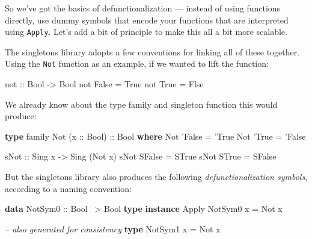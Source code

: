 \documentclass[]{article}
\newenvironment{Shaded}{}{}
\newcommand{\CommentTok}[1]{\textcolor[rgb]{0.38,0.63,0.69}{\textit{#1}}}
\newcommand{\DataTypeTok}[1]{\textcolor[rgb]{0.56,0.13,0.00}{#1}}
\newcommand{\FunctionTok}[1]{\textcolor[rgb]{0.02,0.16,0.49}{#1}}
\newcommand{\KeywordTok}[1]{\textcolor[rgb]{0.00,0.44,0.13}{\textbf{#1}}}
\newcommand{\NormalTok}[1]{#1}
\newcommand{\OtherTok}[1]{\textcolor[rgb]{0.00,0.44,0.13}{#1}}
\begin{document}
So we've got the basics of defunctionalization --- instead of using functions
directly, use dummy symbols that encode your functions that are interpreted
using \texttt{Apply}. Let's add a bit of principle to make this all a bit more
scalable.

The singletons library adopts a few conventions for linking all of these
together. Using the \texttt{Not} function as an example, if we wanted to lift
the function:

\begin{Shaded}
\begin{Highlighting}[]
\NormalTok{not}\OtherTok{ ::} \DataTypeTok{Bool} \OtherTok{->} \DataTypeTok{Bool}
\NormalTok{not }\DataTypeTok{False} \FunctionTok{=} \DataTypeTok{True}
\NormalTok{not }\DataTypeTok{True}  \FunctionTok{=} \DataTypeTok{Flse}
\end{Highlighting}
\end{Shaded}

We already know about the type family and singleton function this would produce:

\begin{Shaded}
\begin{Highlighting}[]
\KeywordTok{type}\NormalTok{ family }\DataTypeTok{Not}\NormalTok{ (}\OtherTok{x ::} \DataTypeTok{Bool}\NormalTok{)}\OtherTok{ ::} \DataTypeTok{Bool} \KeywordTok{where}
    \DataTypeTok{Not}\NormalTok{ '}\DataTypeTok{False} \FunctionTok{=}\NormalTok{ '}\DataTypeTok{True}
    \DataTypeTok{Not}\NormalTok{ '}\DataTypeTok{True}  \FunctionTok{=}\NormalTok{ '}\DataTypeTok{False}

\OtherTok{sNot ::} \DataTypeTok{Sing}\NormalTok{ x }\OtherTok{->} \DataTypeTok{Sing}\NormalTok{ (}\DataTypeTok{Not}\NormalTok{ x)}
\NormalTok{sNot }\DataTypeTok{SFalse} \FunctionTok{=} \DataTypeTok{STrue}
\NormalTok{sNot }\DataTypeTok{STrue}  \FunctionTok{=} \DataTypeTok{SFalse}
\end{Highlighting}
\end{Shaded}

But the singletons library also produces the following \emph{defunctionalization
symbols}, according to a naming convention:

\begin{Shaded}
\begin{Highlighting}[]
\KeywordTok{data} \DataTypeTok{NotSym0}\OtherTok{ ::} \DataTypeTok{Bool} \FunctionTok{~>} \DataTypeTok{Bool}
\KeywordTok{type} \KeywordTok{instance} \DataTypeTok{Apply} \DataTypeTok{NotSym0}\NormalTok{ x }\FunctionTok{=} \DataTypeTok{Not}\NormalTok{ x}

\CommentTok{-- also generated for consistency}
\KeywordTok{type} \DataTypeTok{NotSym1}\NormalTok{ x }\FunctionTok{=} \DataTypeTok{Not}\NormalTok{ x}
\end{Highlighting}
\end{Shaded}
\end{document}
